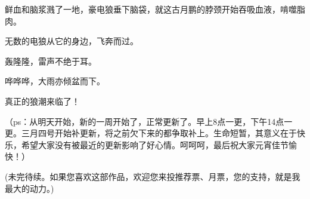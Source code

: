 \begin{this_body}
鲜血和脑浆溅了一地，豪电狼垂下脑袋，就这古月鹏的脖颈开始吞吸血液，啃噬脂肉。

无数的电狼从它的身边，飞奔而过。

轰隆隆，雷声不绝于耳。

哗哗哗，大雨亦倾盆而下。

真正的狼潮来临了！

（ps：从明天开始，新的一周开始了，正常更新了。早上8点一更，下午14点一更。三月四号开始补更新，将之前欠下来的都争取补上。生命短暂，其意义在于快乐，希望大家没有被最近的更新影响了好心情。呵呵呵，最后祝大家元宵佳节愉快！）

(未完待续。如果您喜欢这部作品，欢迎您来投推荐票、月票，您的支持，就是我最大的动力。)

\end{this_body}

